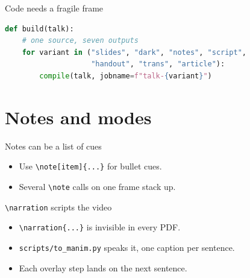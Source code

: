 \documentclass[
  beameroptions={aspectratio=169,ignorenonframetext,11pt},
  articleoptions={11pt,a4paper},
]{beamerswitch}
\begin{document}
\begin{frame}[fragile]{Code needs a fragile frame}
\begin{lstlisting}[language=Python]
def build(talk):
    # one source, seven outputs
    for variant in ("slides", "dark", "notes", "script",
                    "handout", "trans", "article"):
        compile(talk, jobname=f"talk-{variant}")
\end{lstlisting}
\end{frame}

\section{Notes and modes}

\begin{frame}{Notes can be a list of cues}
  \begin{itemize}
    \item Use \texttt{\textbackslash note[item]\{...\}} for bullet cues.
    \item Several \texttt{\textbackslash note} calls on one frame stack up.
  \end{itemize}
\end{frame}

\begin{frame}{\texttt{\textbackslash narration} scripts the video}
  \begin{itemize}
    \item \texttt{\textbackslash narration\{...\}} is invisible in every PDF.
    \item<2-> \texttt{scripts/to\_manim.py} speaks it, one caption per sentence.
    \item<3-> Each overlay step lands on the next sentence.
  \end{itemize}
\end{frame}
\end{document}
